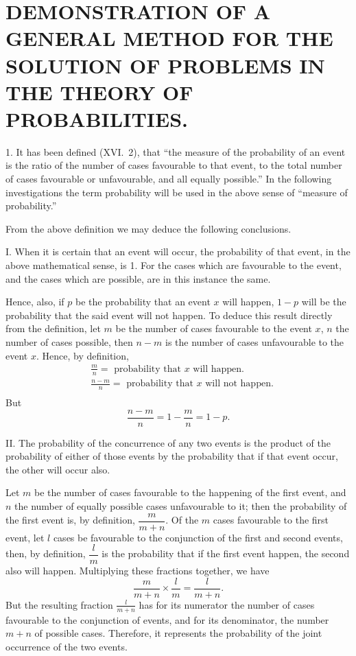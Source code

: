 \documentclass[oneside]{book}
\begin{document}
\chapter[GENERAL METHOD IN PROBABILITIES]{\large DEMONSTRATION OF A GENERAL METHOD FOR THE SOLUTION OF
PROBLEMS IN THE THEORY OF PROBABILITIES.}

1. It has been defined (XVI.~2), that ``the measure of the
probability of an event is the ratio of the number of cases
favourable to that event, to the total number of cases favourable
or unfavourable, and all equally possible.'' In the following
investigations the term probability will be used in the above sense
of ``measure of probability.''

From the above definition we may deduce the following
conclusions.

I. When it is certain that an event will occur, the probability
of that event, in the above mathematical sense, is 1. For the
cases which are favourable to the event, and the cases which are
possible, are in this instance the same.

Hence, also, if $p$ be the probability that an event $x$ will happen,
$1 - p$ will be the probability that the said event will not happen.
To deduce this result directly from the definition, let $m$ be the
number of cases favourable to the event $x$, $n$ the number of cases
possible, then $n - m$ is the number of cases unfavourable to the
event $x$. Hence, by definition,
\begin{align*}
  &\frac{m}{n}     = \textrm{ probability that $x$ will happen.}  \\
  &\frac{n - m}{n} = \textrm{ probability that $x$ will not happen.} \\
\end{align*}
But
\[
  \frac{n - m}{n} = 1- \frac{m}{n} = 1 - p .
\]

II. The probability of the concurrence of any two events is
the product of the probability of either of those events by the
probability that if that event occur, the other will occur also.

Let $m$ be the number of cases favourable to the happening
of the first event, and $n$ the number of equally possible cases unfavourable to it;
then the probability of the first event is, by
definition, $\dfrac{m}{m + n}$. Of the $m$ cases favourable to the first event, let $l$
cases be favourable to the conjunction of the first and second
events, then, by definition, $\dfrac{l}{m}$ is the probability that if the first
event happen, the second also will happen. Multiplying these
fractions together, we have
\[
  \frac{m}{m + n} \times \frac{l}{m} = \frac{l}{m + n}.
\]
But the resulting fraction $\frac{l}{m + n}$ has for its numerator
the number of cases favourable to the conjunction of events, and for its
denominator, the number $m + n$ of possible cases. Therefore,
it represents the probability of the joint occurrence of the two
events.
\end{document}
